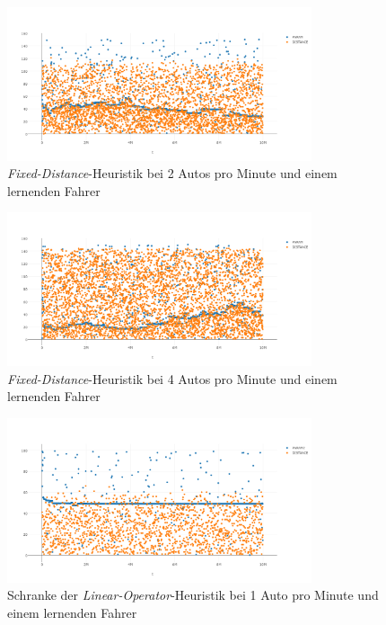 \begin{figure}[H]
	\includegraphics[width=0.8\textwidth]{analyse/SingleMutant/fixeddistance2.png}
	\caption{\emph{Fixed-Distance}-Heuristik bei 2 Autos pro Minute und einem lernenden Fahrer}\label{fig:ap_sm_fd_2}
\end{figure}
\begin{figure}[H]
	\includegraphics[width=0.8\textwidth]{analyse/SingleMutant/fixeddistance4.png}
	\caption{\emph{Fixed-Distance}-Heuristik bei 4 Autos pro Minute und einem lernenden Fahrer}\label{fig:ap_sm_fd_4}
\end{figure}
\begin{figure}[H]
	\includegraphics[width=0.8\textwidth]{analyse/SingleMutant/linopzt1.png}
	\caption{Schranke der \emph{Linear-Operator}-Heuristik bei 1 Auto pro Minute und einem lernenden Fahrer}\label{fig:ap_sm_loz_1}
\end{figure}
